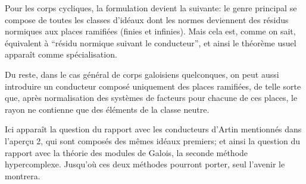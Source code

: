 Pour les corps cycliques, la formulation devient la suivante: le genre principal se compose de toutes les classes d'idéaux dont les normes deviennent des résidus normiques aux places ramifiées (finies et infinies). Mais cela est, comme on sait, équivalent à ``résidu normique suivant le conducteur'', et ainsi le théorème usuel apparaît comme spécialisation.

Du reste, dans le cas général de corps galoisiens quelconques, on peut aussi introduire un conducteur composé uniquement des places ramifiées, de telle sorte que, après normalisation des systèmes de facteurs pour chacune de ces places, le rayon ne contienne que des éléments de la classe neutre.

Ici apparaît la question du rapport avec les conducteurs d'Artin mentionnés dans l'aperçu 2, qui sont composés des mêmes idéaux premiers; et ainsi la question du rapport avec la théorie des modules de Galois, la seconde méthode hypercomplexe. Jusqu'où ces deux méthodes pourront porter, seul l'avenir le montrera.

\setcounter{footnote}{0}
\clearpage
